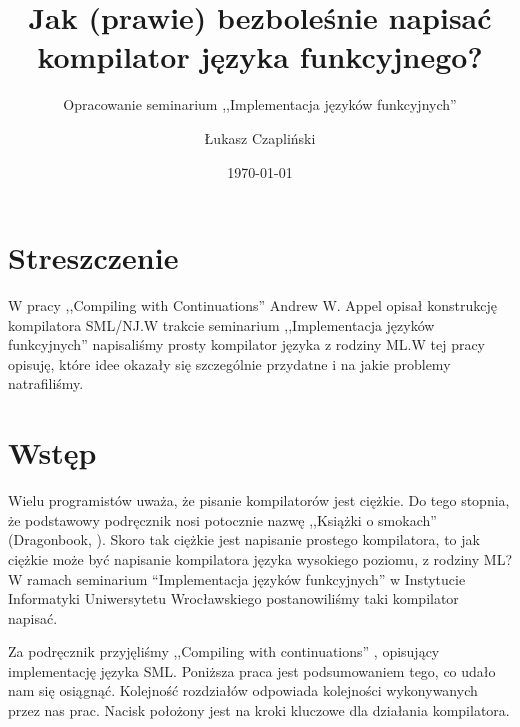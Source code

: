 \documentclass[11pt]{scrartcl}
\title{Jak (prawie) bezboleśnie napisać kompilator języka funkcyjnego?}
\subtitle{Opracowanie seminarium ,,Implementacja języków funkcyjnych''}
\author{Łukasz Czapliński}
\date{\today}
\begin{document}
\maketitle

\vfill
\section*{Streszczenie}
W pracy ,,Compiling with Continuations'' Andrew W. Appel opisał konstrukcję
kompilatora SML/NJ.\@ W trakcie seminarium ,,Implementacja języków funkcyjnych''
napisaliśmy prosty kompilator języka z rodziny ML.\@ W  tej pracy opisuję, które
idee okazały się szczególnie przydatne i na jakie problemy natrafiliśmy.

\vfill

\section{Wstęp}
Wielu programistów uważa, że pisanie kompilatorów jest ciężkie. Do tego stopnia,
że podstawowy podręcznik nosi potocznie nazwę ,,Książki o smokach'' (Dragonbook,
\cite{Dragonbook}).
Skoro tak ciężkie jest napisanie prostego kompilatora, to jak ciężkie może być
napisanie kompilatora języka wysokiego poziomu, z rodziny ML?\@ W ramach
seminarium “Implementacja języków funkcyjnych” w Instytucie Informatyki
Uniwersytetu Wrocławskiego postanowiliśmy taki kompilator napisać.

Za podręcznik przyjęliśmy ,,Compiling with continuations'' \cite{Appel}, opisujący
implementację języka SML.
Poniższa praca jest podsumowaniem tego, co udało nam się osiągnąć.
Kolejność rozdziałów odpowiada kolejności wykonywanych przez nas prac.
Nacisk położony jest na kroki kluczowe dla działania kompilatora.
\end{document}
